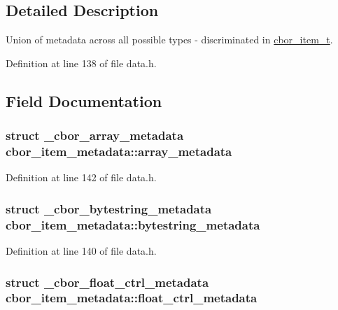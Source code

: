 \subsection{Detailed Description}
Union of metadata across all possible types -\/ discriminated in \hyperlink{structcbor__item__t}{cbor\-\_\-item\-\_\-t}. 

Definition at line 138 of file data.\-h.



\subsection{Field Documentation}
\hypertarget{unioncbor__item__metadata_a51c4b86bb4e0313193df52d1320f9237}{
\subsubsection[{array\-\_\-metadata}]{\setlength{\rightskip}{0pt plus 5cm}struct {\bf \-\_\-cbor\-\_\-array\-\_\-metadata} cbor\-\_\-item\-\_\-metadata\-::array\-\_\-metadata}}\label{unioncbor__item__metadata_a51c4b86bb4e0313193df52d1320f9237}


Definition at line 142 of file data.\-h.

\hypertarget{unioncbor__item__metadata_a90851d347147760c9cef8d7af485d006}{
\subsubsection[{bytestring\-\_\-metadata}]{\setlength{\rightskip}{0pt plus 5cm}struct {\bf \-\_\-cbor\-\_\-bytestring\-\_\-metadata} cbor\-\_\-item\-\_\-metadata\-::bytestring\-\_\-metadata}}\label{unioncbor__item__metadata_a90851d347147760c9cef8d7af485d006}


Definition at line 140 of file data.\-h.

\hypertarget{unioncbor__item__metadata_a456a58064b25bc6563df665bed5c122d}{
\subsubsection[{float\-\_\-ctrl\-\_\-metadata}]{\setlength{\rightskip}{0pt plus 5cm}struct {\bf \-\_\-cbor\-\_\-float\-\_\-ctrl\-\_\-metadata} cbor\-\_\-item\-\_\-metadata\-::float\-\_\-ctrl\-\_\-metadata}}\label{unioncbor__item__metadata_a456a58064b25bc6563df665bed5c122d}


